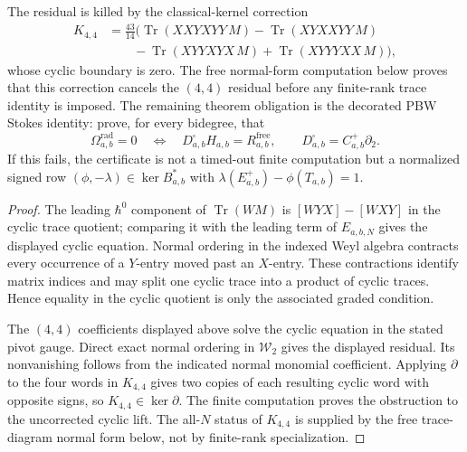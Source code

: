 \begin{stmt}
  The residual is killed by the classical-kernel correction
  \[
  \begin{aligned}
    K_{4,4}
    &=
    \frac{43}{14}\bigl(
      \operatorname{Tr}(XXYXYY\,M)
      -\operatorname{Tr}(XYXXYY\,M)
      \\
    &\qquad
      -\operatorname{Tr}(XYYXYX\,M)
      +\operatorname{Tr}(XYYYXX\,M)
    \bigr),
  \end{aligned}
  \]
  whose cyclic boundary is zero.  The free normal-form computation below
  proves that this correction cancels the \((4,4)\) residual before any
  finite-rank trace identity is imposed.  The remaining theorem
  obligation is the decorated PBW Stokes identity: prove, for every
  bidegree, that
  \[
    \Omega^{\mathrm{rad}}_{a,b}=0
    \quad\Longleftrightarrow\quad
    D^\square_{a,b}H_{a,b}=R^{\mathrm{free}}_{a,b},
    \qquad
    D^\square_{a,b}=C^+_{a,b}\partial_2 .
  \]
  If this fails, the certificate is not a timed-out finite computation
  but a normalized signed row
  \((\phi,-\lambda)\in\ker B_{a,b}^*\) with
  \(\lambda(E^+_{a,b})-\phi(T_{a,b})=1\).
\end{stmt}

\begin{proof}
  The leading \(\hbar^0\) component of
  \(\operatorname{Tr}(W M)\) is
  \([WYX]-[WXY]\) in the cyclic trace quotient; comparing it with the
  leading term of \(E_{a,b,N}\) gives the displayed cyclic equation.
  Normal ordering in the indexed Weyl algebra contracts every occurrence
  of a \(Y\)-entry moved past an \(X\)-entry.  These contractions identify
  matrix indices and may split one cyclic trace into a product of cyclic
  traces.  Hence equality in the cyclic quotient is only the associated
  graded condition.

  The \((4,4)\) coefficients displayed above solve the cyclic equation
  in the stated pivot gauge.  Direct exact normal ordering in
  \(\mathcal W_2\) gives the displayed residual.  Its nonvanishing follows
  from the indicated normal monomial coefficient.  Applying \(\partial\)
  to the four words in \(K_{4,4}\) gives two copies of each resulting
  cyclic word with opposite signs, so \(K_{4,4}\in\ker\partial\).  The
  finite computation proves the obstruction to the uncorrected cyclic
  lift.  The all-\(N\) status of \(K_{4,4}\) is supplied by the free
  trace-diagram normal form below, not by finite-rank specialization.
\end{proof}

